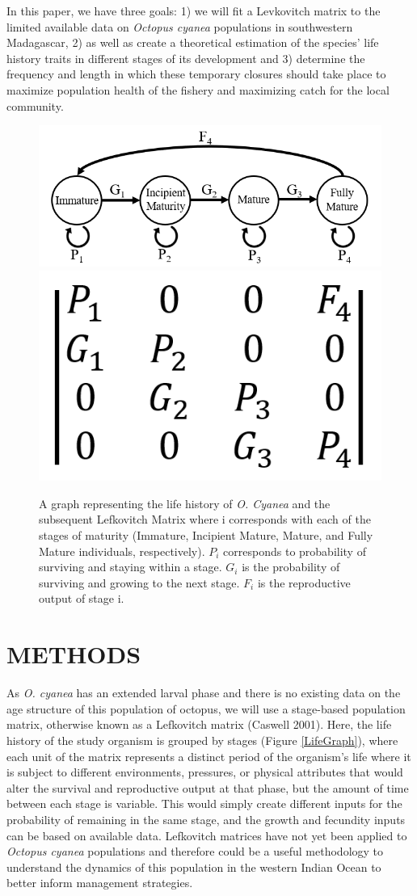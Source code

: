 \documentclass[
]{article}
\begin{document}
In this paper, we have three goals: 1) we will fit a Levkovitch matrix to the limited available data on \emph{Octopus cyanea} populations in southwestern Madagascar, 2) as well as create a theoretical estimation of the species' life history traits in different stages of its development and 3) determine the frequency and length in which these temporary closures should take place to maximize population health of the fishery and maximizing catch for the local community.



\begin{figure}
\includegraphics[width=0.45\linewidth]{LifeGraph} \includegraphics[width=0.45\linewidth]{MtxGeneric} \caption{A graph representing the life history of \emph{O. Cyanea} and the subsequent Lefkovitch Matrix where i corresponds with each of the stages of maturity (Immature, Incipient Mature, Mature, and Fully Mature individuals, respectively). \(P_i\) corresponds to probability of surviving and staying within a stage. \(G_i\) is the probability of surviving and growing to the next stage. \(F_i\) is the reproductive output of stage i. \label{LifeGraph}}\label{fig:LifeGraph}
\end{figure}

\hypertarget{methods}{%
\section{METHODS}\label{methods}}

As \emph{O. cyanea} has an extended larval phase and there is no existing data on the age structure of this population of octopus, we will use a stage-based population matrix, otherwise known as a Lefkovitch matrix (Caswell 2001). Here, the life history of the study organism is grouped by stages (Figure \ref{LifeGraph}), where each unit of the matrix represents a distinct period of the organism's life where it is subject to different environments, pressures, or physical attributes that would alter the survival and reproductive output at that phase, but the amount of time between each stage is variable. This would simply create different inputs for the probability of remaining in the same stage, and the growth and fecundity inputs can be based on available data. Lefkovitch matrices have not yet been applied to \emph{Octopus cyanea} populations and therefore could be a useful methodology to understand the dynamics of this population in the western Indian Ocean to better inform management strategies.
\end{document}
